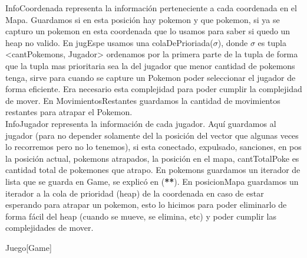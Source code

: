 \begin{Representacion}
InfoCoordenada representa la informaci\'on perteneciente a cada coordenada en el Mapa. Guardamos si en esta posici\'on hay pokemon y que pokemon, si ya se capturo un pokemon en esta coordenada que lo usamos para saber si quedo un heap no valido. En jugEspe usamos una colaDePrioriada($\sigma$), donde $\sigma$ es tupla <cantPokemons, Jugador> ordenamos por la primera parte de la tupla de forma que la tupla mas prioritaria sea la del jugador que menor cantidad de pokemons tenga, sirve para cuando se capture un Pokemon poder seleccionar el jugador de forma eficiente. Era necesario esta complejidad para poder cumplir la complejidad de mover. En MovimientosRestantes guardamos la cantidad de movimientos restantes para atrapar el Pokemon.\\
InfoJugador representa la informaci\'on de cada jugador. Aqu\'i guardamos al jugador (para no depender solamente del la posici\'on del vector que algunas veces lo recorremos pero no lo tenemos), si esta conectado, expulsado, sanciones, en pos la posici\'on actual, pokemons atrapados, la posici\'on en el mapa, cantTotalPoke es cantidad total de pokemones que atrapo. En pokemons guardamos un iterador  de lista que se guarda en Game, se explic\'o en (\textbf{**}). En posicionMapa guardamos un iterador a la cola de prioridad (heap) de la coordenada en caso de estar esperando para atrapar un pokemon, esto lo hicimos para poder eliminarlo de forma f\'acil del heap (cuando se mueve, se elimina, etc) y poder cumplir las complejidades de mover.


	\begin{Estructura}{Juego}[Game]
		\begin{Tupla}[Game]
		\end{Tupla}
	\end{Estructura}
	
	\begin{Tupla}[InfoJugador]
	\end{Tupla}
	

\end{Representacion}
